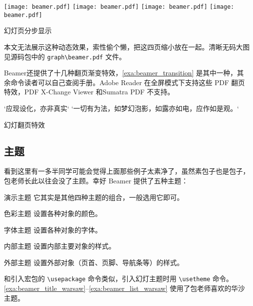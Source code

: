 \begin{example}[htbp]
\begin{Demo}
\centering
\texttt{[image: beamer.pdf]}
\texttt{[image: beamer.pdf]}
\texttt{[image: beamer.pdf]}
\texttt{[image: beamer.pdf]}
\end{Demo}
\caption{幻灯页分步显示}
\label{exa:beamer_pause}
\end{example}

本文无法展示这种动态效果，索性偷个懒，把这四页缩小放在一起。清晰无码大图见源码包中的 \verb|graph\beamer.pdf| 文件。

Beamer还提供了十几种翻页渐变特效，\autoref{exa:beamer_transition} 是其中一种，其余命令读者可以自己查阅手册\citep{Tantau_beamer}。Adobe Reader 在全屏模式下支持这些 PDF 翻页特效，PDF X-Change Viewer 和Sumatra PDF 不支持。

\begin{example}[htbp]
\begin{Code}[]
\begin{frame}{`应现设化，亦非真实`}
\transdissolve
`一切有为法，如梦幻泡影，如露亦如电，应作如是观。`
\end{frame}
\end{Code}
\caption{幻灯翻页特效}
\label{exa:beamer_transition}
\end{example}

\subsection{主题} 

看到这里有一多半同学可能会觉得上面那些例子太素净了，虽然素包子也是包子，包老师长此以往会没了主顾。幸好 Beamer 提供了五种主题：

\begin{compactdesc}
  \item [演示主题] 它其实是其他四种主题的组合，一般选用它即可。
  \item [色彩主题] 设置各种对象的颜色。
  \item [字体主题] 设置各种对象的字体。
  \item [内部主题] 设置内部主要对象的样式。
  \item [外部主题] 设置外部对象（页首、页脚、导航条等）的样式。
\end{compactdesc}
 
和引入宏包的 \verb|\usepackage| 命令类似，引入幻灯主题时用 \verb|\usetheme| 命令。\autoref{exa:beamer_title_warsaw}--\autoref{exa:beamer_list_warsaw} 使用了包老师喜欢的华沙主题。

